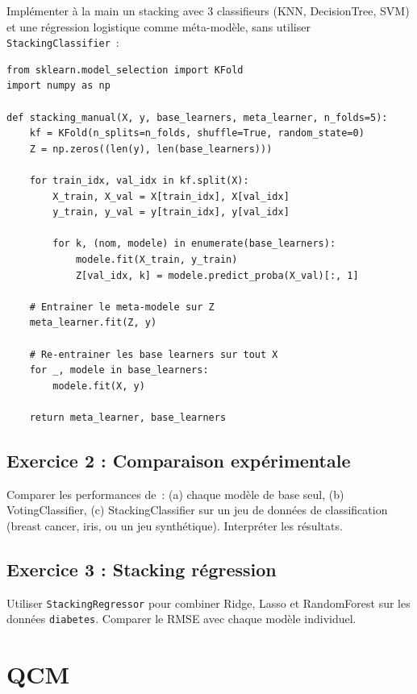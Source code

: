 \documentclass[a4paper,11pt]{article}
\theoremstyle{definition}
\theoremstyle{remark}
\begin{document}
Impl\'ementer \`a la main un stacking avec 3 classifieurs (KNN,
DecisionTree, SVM) et une r\'egression logistique comme
m\'eta-mod\`ele, sans utiliser \texttt{StackingClassifier}~:

\begin{lstlisting}
from sklearn.model_selection import KFold
import numpy as np

def stacking_manual(X, y, base_learners, meta_learner, n_folds=5):
    kf = KFold(n_splits=n_folds, shuffle=True, random_state=0)
    Z = np.zeros((len(y), len(base_learners)))
    
    for train_idx, val_idx in kf.split(X):
        X_train, X_val = X[train_idx], X[val_idx]
        y_train, y_val = y[train_idx], y[val_idx]
        
        for k, (nom, modele) in enumerate(base_learners):
            modele.fit(X_train, y_train)
            Z[val_idx, k] = modele.predict_proba(X_val)[:, 1]
    
    # Entrainer le meta-modele sur Z
    meta_learner.fit(Z, y)
    
    # Re-entrainer les base learners sur tout X
    for _, modele in base_learners:
        modele.fit(X, y)
    
    return meta_learner, base_learners
\end{lstlisting}

\subsection{Exercice 2 : Comparaison exp\'erimentale}

Comparer les performances de~: (a) chaque mod\`ele de base seul,
(b) VotingClassifier, (c) StackingClassifier sur un jeu de donn\'ees
de classification (breast cancer, iris, ou un jeu synth\'etique).
Interpr\'eter les r\'esultats.

\subsection{Exercice 3 : Stacking r\'egression}

Utiliser \texttt{StackingRegressor} pour combiner Ridge, Lasso et
RandomForest sur les donn\'ees \texttt{diabetes}. Comparer le RMSE
avec chaque mod\`ele individuel.

\section{QCM}
\end{document}
